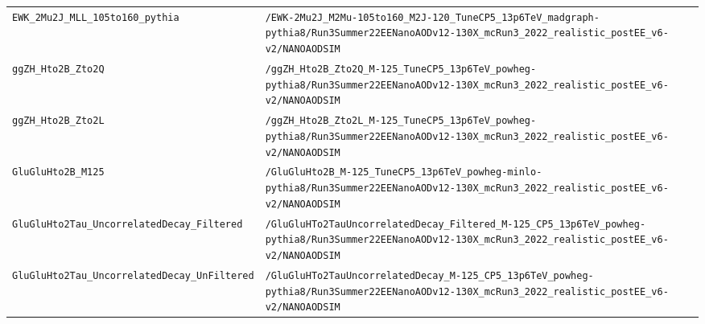 \begin{longtable}{@{}>{\RaggedRight\arraybackslash}p{} >{\RaggedRight\arraybackslash}p{}@{}}
\addlinespace[2pt]
\texttt{EWK\_\allowbreak{}2Mu2J\_\allowbreak{}MLL\_\allowbreak{}105to160\_\allowbreak{}pythia} & \texttt{/\allowbreak{}EWK-\allowbreak{}2Mu2J\_\allowbreak{}M2Mu-\allowbreak{}105to160\_\allowbreak{}M2J-\allowbreak{}120\_\allowbreak{}TuneCP5\_\allowbreak{}13p6TeV\_\allowbreak{}madgraph-\allowbreak{}pythia8/\allowbreak{}Run3Summer22EENanoAODv12-\allowbreak{}130X\_\allowbreak{}mcRun3\_\allowbreak{}2022\_\allowbreak{}realistic\_\allowbreak{}postEE\_\allowbreak{}v6-\allowbreak{}v2/\allowbreak{}NANOAODSIM} \\
\addlinespace[2pt]
\texttt{ggZH\_\allowbreak{}Hto2B\_\allowbreak{}Zto2Q} & \texttt{/\allowbreak{}ggZH\_\allowbreak{}Hto2B\_\allowbreak{}Zto2Q\_\allowbreak{}M-\allowbreak{}125\_\allowbreak{}TuneCP5\_\allowbreak{}13p6TeV\_\allowbreak{}powheg-\allowbreak{}pythia8/\allowbreak{}Run3Summer22EENanoAODv12-\allowbreak{}130X\_\allowbreak{}mcRun3\_\allowbreak{}2022\_\allowbreak{}realistic\_\allowbreak{}postEE\_\allowbreak{}v6-\allowbreak{}v2/\allowbreak{}NANOAODSIM} \\
\addlinespace[2pt]
\texttt{ggZH\_\allowbreak{}Hto2B\_\allowbreak{}Zto2L} & \texttt{/\allowbreak{}ggZH\_\allowbreak{}Hto2B\_\allowbreak{}Zto2L\_\allowbreak{}M-\allowbreak{}125\_\allowbreak{}TuneCP5\_\allowbreak{}13p6TeV\_\allowbreak{}powheg-\allowbreak{}pythia8/\allowbreak{}Run3Summer22EENanoAODv12-\allowbreak{}130X\_\allowbreak{}mcRun3\_\allowbreak{}2022\_\allowbreak{}realistic\_\allowbreak{}postEE\_\allowbreak{}v6-\allowbreak{}v2/\allowbreak{}NANOAODSIM} \\
\addlinespace[2pt]
\texttt{GluGluHto2B\_\allowbreak{}M125} & \texttt{/\allowbreak{}GluGluHto2B\_\allowbreak{}M-\allowbreak{}125\_\allowbreak{}TuneCP5\_\allowbreak{}13p6TeV\_\allowbreak{}powheg-\allowbreak{}minlo-\allowbreak{}pythia8/\allowbreak{}Run3Summer22EENanoAODv12-\allowbreak{}130X\_\allowbreak{}mcRun3\_\allowbreak{}2022\_\allowbreak{}realistic\_\allowbreak{}postEE\_\allowbreak{}v6-\allowbreak{}v2/\allowbreak{}NANOAODSIM} \\
\addlinespace[2pt]
\texttt{GluGluHto2Tau\_\allowbreak{}UncorrelatedDecay\_\allowbreak{}Filtered} & \texttt{/\allowbreak{}GluGluHTo2TauUncorrelatedDecay\_\allowbreak{}Filtered\_\allowbreak{}M-\allowbreak{}125\_\allowbreak{}CP5\_\allowbreak{}13p6TeV\_\allowbreak{}powheg-\allowbreak{}pythia8/\allowbreak{}Run3Summer22EENanoAODv12-\allowbreak{}130X\_\allowbreak{}mcRun3\_\allowbreak{}2022\_\allowbreak{}realistic\_\allowbreak{}postEE\_\allowbreak{}v6-\allowbreak{}v2/\allowbreak{}NANOAODSIM} \\
\addlinespace[2pt]
\texttt{GluGluHto2Tau\_\allowbreak{}UncorrelatedDecay\_\allowbreak{}UnFiltered} & \texttt{/\allowbreak{}GluGluHTo2TauUncorrelatedDecay\_\allowbreak{}M-\allowbreak{}125\_\allowbreak{}CP5\_\allowbreak{}13p6TeV\_\allowbreak{}powheg-\allowbreak{}pythia8/\allowbreak{}Run3Summer22EENanoAODv12-\allowbreak{}130X\_\allowbreak{}mcRun3\_\allowbreak{}2022\_\allowbreak{}realistic\_\allowbreak{}postEE\_\allowbreak{}v6-\allowbreak{}v2/\allowbreak{}NANOAODSIM} \\

\end{longtable}
